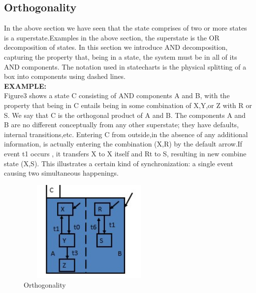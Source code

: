 \documentclass{article}
\begin{document}
\subsection{Orthogonality}
In the above section we have seen that the state comprises of two or more states is a superstate.Examples in the above section, the superstate is the OR decomposition of states. In this section we introduce AND decomposition, capturing the property that, being in a state, the system must be in all of its AND components. The notation used in statecharts is the physical splitting of a box into components using dashed lines.\\
\textbf{EXAMPLE:}\\
Figure3 shows a state C consisting of AND components A and B, with the property that being in C entails being in some combination of X,Y,or Z with R or S. We say that C is the orthogonal product of A and B. The components A and B are no different conceptually from any other superstate; they have defaults, internal transitions,etc. Entering C from outside,in the absence of any additional information, is actually entering the combination (X,R) by the default arrow.If event t1 occurs , it transfers X to X itself and Rt to S, resulting in new combine state (X,S). This illustrates a certain kind of synchronization: a single event causing two simultaneous  happenings.\\
\begin{figure}[h]
\centering
\includegraphics[width=7cm,height=5cm]{Screenshot002.jpg}
\caption{Orthogonality}
\end{figure}\\
\newpage
\end{document}
